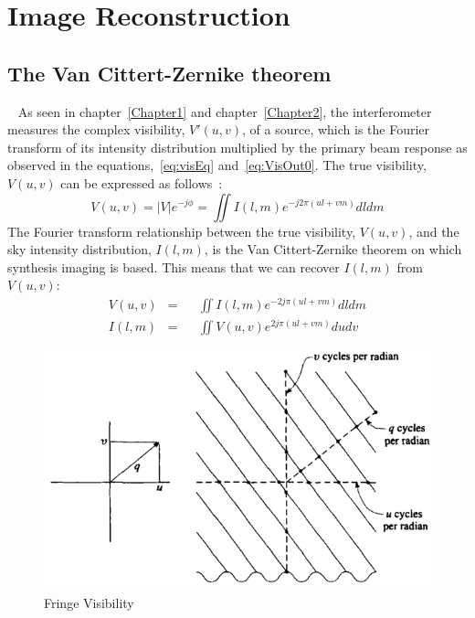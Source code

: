 
\chapter{Image Reconstruction} %

\label{Chapter3} %



\section{The Van Cittert-Zernike theorem}\
\label{sec:about3}
As seen in chapter~\ref{Chapter1} and chapter~\ref{Chapter2}, the interferometer measures the complex visibility, $V'(u,v)$, of a source, which is the Fourier transform of its intensity distribution multiplied by the primary beam response as observed in the equations,~\ref{eq:visEq} and~\ref{eq:VisOut0}. The true visibility, $V(u,v)$ can be expressed as follows~\citep[Slide 8]{jdf.webinar.2}:
\begin{equation}
\label{eq:visiPhase}
	V(u,v) = |V|e^{-j\phi} = \iint{I(l,m)e^{-j2\pi{(ul +vm)}}dldm} 
\end{equation}
The Fourier transform relationship between the true visibility, $V(u,v)$, and the sky intensity distribution, $I(l,m)$, is the Van Cittert-Zernike theorem on which synthesis imaging is based.
This means that we can recover $I(l,m)$ from $V(u,v)$: 
\begin{align}
V(u,v) &=& &\iint{I(l,m){e^{-2j\pi{(ul +vm)}}} dldm}\\
I(l,m) &=& &\iint{V(u,v){e^{2j\pi{(ul +vm)}}} dudv}
\end{align}
\begin{figure}[htbp]
\center
    \includegraphics[scale= 0.3]{Figures/phaseQ}
 	\caption[Fringe Visibility]{Fringe Visibility~\citep[Pg. 64,~Fig. 2.7]{thompson2008interferometry}}
	\label{fig:VisiPhaseQ}
\end{figure}
